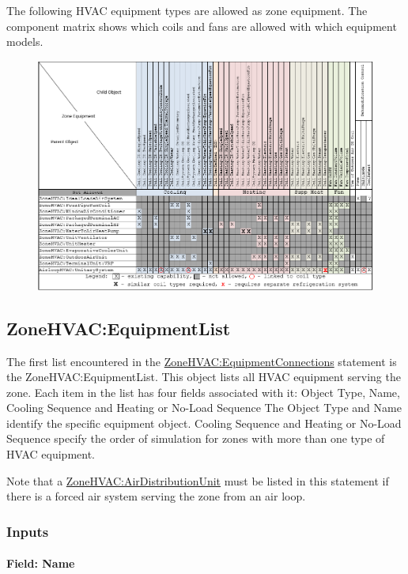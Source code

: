 The following HVAC equipment types are allowed as zone equipment. The component matrix shows which coils and fans are allowed with which equipment models.

\begin{figure}[htbp]
\centering
\includegraphics{media/ZoneComponentMatrix.png}
\caption{}
\end{figure}

\subsection{ZoneHVAC:EquipmentList}\label{zonehvacequipmentlist}

The first list encountered in the \hyperref[zonehvacequipmentconnections]{ZoneHVAC:EquipmentConnections} statement is the ZoneHVAC:EquipmentList. This object lists all HVAC equipment serving the zone. Each item in the list has four fields associated with it: Object Type, Name, Cooling Sequence and Heating or No-Load Sequence The Object Type and Name identify the specific equipment object. Cooling Sequence and Heating or No-Load Sequence specify the order of simulation for zones with more than one type of HVAC equipment.

Note that a \hyperref[zonehvacairdistributionunit]{ZoneHVAC:AirDistributionUnit} must be listed in this statement if there is a forced air system serving the zone from an air loop.

\subsubsection{Inputs}\label{inputs-2-048}

\paragraph{Field: Name}\label{field-name-1-050}

